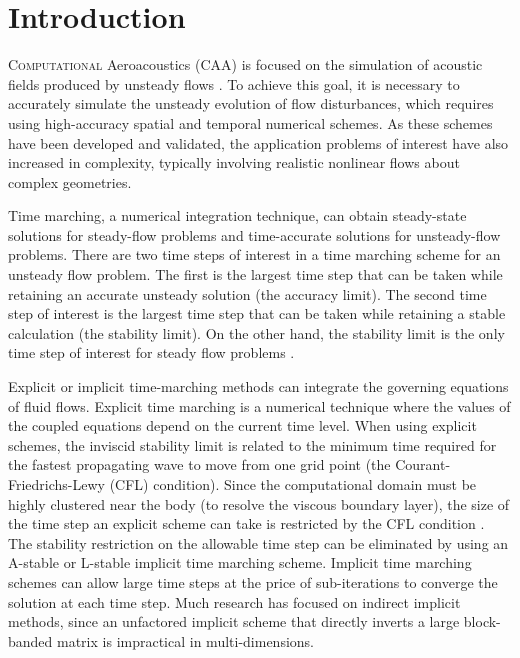\documentclass[conf]{new-aiaa}
\begin{document}
\section{Introduction}
\label{sec:Introdtion}
\lettrine{C}{omputational} Aeroacoustics (CAA) is focused on the simulation of acoustic fields produced by unsteady flows \cite{Tam_General, Lele, Tam_OverView, COLONIUS2004345}.  
To achieve this goal, it is necessary to accurately simulate the unsteady evolution of flow disturbances, which requires using high-accuracy spatial and temporal numerical schemes.
As these schemes have been developed and validated, the application problems of interest have also increased in complexity, typically involving realistic nonlinear flows about complex geometries.


Time marching, a numerical integration technique, can obtain steady-state solutions for steady-flow problems and time-accurate solutions for unsteady-flow problems.
There are two time steps of interest in a time marching scheme for an unsteady flow problem. 
The first is the largest time step that can be taken while retaining an accurate unsteady solution (the accuracy limit). 
The second time step of interest is the largest time step that can be taken while retaining a stable calculation (the stability limit).
On the other hand, the stability limit is the only time step of interest for steady flow problems \cite{Pulliamm}. 

Explicit or implicit time-marching methods can integrate the governing equations of fluid flows. 
Explicit time marching is a numerical technique where the values of the coupled equations depend on the current time level. 
When using explicit schemes, the inviscid stability limit is related to the minimum time required for the fastest propagating wave to move from one grid point (the Courant-Friedrichs-Lewy (CFL) condition). 
Since the computational domain must be highly clustered near the body (to resolve the viscous boundary layer), the size of the time step an explicit scheme can take is restricted by the CFL condition \cite{Maccormack, YoonLUSGS}.
The stability restriction on the allowable time step can be eliminated by using an A-stable or L-stable implicit time marching scheme.
Implicit time marching schemes can allow large time steps \cite{A_Stable} at the price of sub-iterations to converge the solution at each time step.
Much research has focused on indirect implicit methods, since an unfactored implicit scheme that directly inverts a large block-banded matrix is impractical in multi-dimensions.
\end{document}
